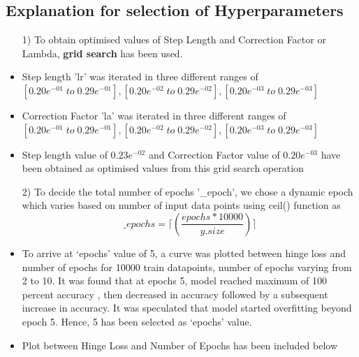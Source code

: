 \documentclass{article}
\begin{document}
\subsection{Explanation for selection of Hyperparameters}

\begin{itemize}
\item[1)] To obtain optimised values of Step Length and Correction Factor or Lambda, \textbf{grid search} has been used.
\item Step length 'lr' was iterated in three different ranges of $[0.20e^{-01} \; to \; 0.29e^{-01}],[0.20e^{-02}\;  to \; 0.29e^{-02}],[0.20e^{-03} \; to \; 0.29e^{-03}]$
\item Correction Factor 'la' was iterated in three different ranges of $[0.20e^{-01} \; to \; 0.29e^{-01}],[0.20e^{-02}\;  to \; 0.29e^{-02}],[0.20e^{-03} \; to \; 0.29e^{-03}]$
\item Step length value of $0.23e^{-02}$ and Correction Factor value of $0.20e^{-03}$ have been obtained as optimised values from this grid search operation
\item[2)] To decide the total number of epochs '\_epoch', we chose a dynamic epoch which varies based on number of input data points using ceil() function as 
\[\_epochs = \lceil(\frac{epochs*10000}{y.size})\rceil\]
\item To arrive at ‘epochs’ value of 5, a curve was plotted between hinge loss and number of epochs for 10000 train datapoints, number of epochs varying from 2 to 10. It was found that at epochs 5, model reached maximum of 100 percent accuracy , then decreased in accuracy followed by a subsequent increase in accuracy. It was speculated that model started overfitting beyond epoch 5. Hence,  5 has been selected as ‘epochs’ value.
\item Plot between Hinge Loss and Number of Epochs has been included below\\
\\

\end{itemize}
\end{document}
